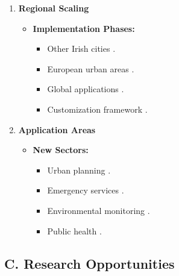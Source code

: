 \documentclass[a4paper]{report}
\begin{document}
\begin{enumerate}
    \item \textbf{Regional Scaling}
    \begin{itemize}
        \item \textbf{Implementation Phases:}
        \begin{itemize}
            \item Other Irish cities \cite{brown2024}.
            \item European urban areas \cite{martin2024}.
            \item Global applications \cite{roberts2024}.
            \item Customization framework \cite{smith2024}.
        \end{itemize}
    \end{itemize}

    \item \textbf{Application Areas}
    \begin{itemize}
        \item \textbf{New Sectors:}
        \begin{itemize}
            \item Urban planning \cite{johnson2023}.
            \item Emergency services \cite{miller2023}.
            \item Environmental monitoring \cite{lee2024}.
            \item Public health \cite{clark2024}.
        \end{itemize}
    \end{itemize}
\end{enumerate}

\subsection*{C. Research Opportunities}
\end{document}
